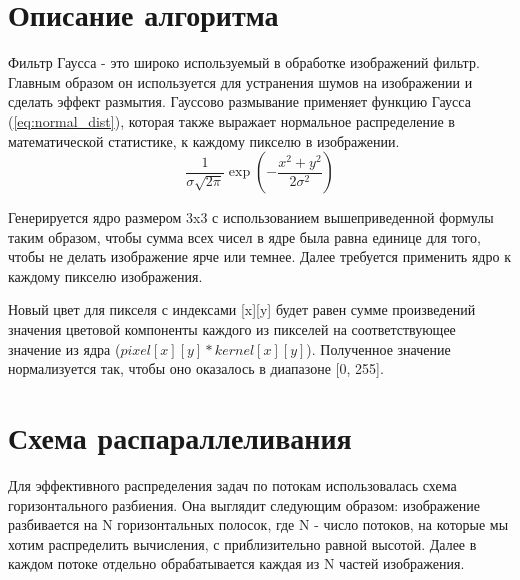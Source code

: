 \documentclass{report}
\begin{document}
\section*{Описание алгоритма}
    \par Фильтр Гаусса - это широко используемый в обработке изображений фильтр. Главным образом он используется для устранения шумов на изображении и сделать эффект размытия. Гауссово размывание применяет функцию Гаусса (\ref{eq:normal_dist}), которая также выражает нормальное распределение в математической статистике, к каждому пикселю в изображении.
    \begin{equation}
        \label{eq:normal_dist}
        \frac{1}{\sigma\sqrt{2\pi}}\exp\left(-\frac{x^2 + y^2}{2\sigma^2}\right)
    \end{equation}
    \par Генерируется ядро размером 3x3 с использованием вышеприведенной формулы таким образом, чтобы сумма всех чисел в ядре была равна единице для того, чтобы не делать изображение ярче или темнее. Далее требуется применить ядро к каждому пикселю изображения.
    \par Новый цвет для пикселя с индексами [x][y] будет равен сумме произведений значения цветовой компоненты каждого из пикселей на соответствующее значение из ядра ($pixel[x][y] * kernel[x][y]$). Полученное значение нормализуется так, чтобы оно оказалось в диапазоне [0, 255].
\newpage

\section*{Схема распараллеливания}
\par Для эффективного распределения задач по потокам использовалась схема горизонтального разбиения. Она выглядит следующим образом: изображение разбивается на N горизонтальных полосок, где N - число потоков, на которые мы хотим распределить вычисления, с приблизительно равной высотой. Далее в каждом потоке отдельно обрабатывается каждая из N частей изображения.
\newpage

\end{document}
